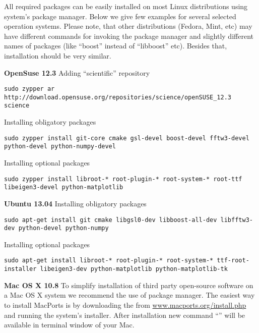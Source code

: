 All required packages can be easily installed on most Linux distributions using system's package
manager. Below we give few examples for several selected operation systems. Please note,
that other distributions (Fedora, Mint, etc) may have different commands for invoking the package manager and slightly different names of packages (like ``boost'' instead of ``libboost'' etc). Besides that, installation should be very similar.
\vspace*{3mm}

\noindent
{\large\bf OpenSuse 12.3} \newline
Adding ``scientific'' repository 
\begin{lstlisting}[language=shell, style=commandline]
sudo zypper ar http://download.opensuse.org/repositories/science/openSUSE_12.3 science
\end{lstlisting}

\noindent
Installing obligatory packages
\begin{lstlisting}[language=shell, style=commandline]
sudo zypper install git-core cmake gsl-devel boost-devel fftw3-devel python-devel python-numpy-devel
\end{lstlisting}

\noindent
Installing optional packages
\begin{lstlisting}[language=shell, style=commandline]
sudo zypper install libroot-* root-plugin-* root-system-* root-ttf libeigen3-devel python-matplotlib
\end{lstlisting}
\vspace*{3mm}


\noindent
{\large\bf Ubuntu 13.04} \newline
Installing obligatory packages
\begin{lstlisting}[language=shell, style=commandline]
sudo apt-get install git cmake libgsl0-dev libboost-all-dev libfftw3-dev python-devel python-numpy
\end{lstlisting}

\noindent
Installing optional packages
\begin{lstlisting}[language=shell, style=commandline]
sudo apt-get install libroot-* root-plugin-* root-system-* ttf-root-installer libeigen3-dev python-matplotlib python-matplotlib-tk
\end{lstlisting}
\vspace*{3mm}


\noindent
\noindent
{\large\bf Mac OS X 10.8} \newline
To simplify installation of third party open-source software on a Mac OS X system we recommend the use of  package manager. 
The easiest way to install MacPorts is by downloading the  
from \url{www.macports.org/install.php} and running the system's installer.
After installation new command ``'' will be available in terminal window of your Mac. \

